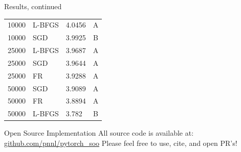 \documentclass[final]{beamer}
\newlength{\colwidth}
\begin{document}
\begin{frame}[t]
\begin{columns}[t]
\begin{column}{\colwidth}
\begin{block}{Results, continued}
\begin{table}[]
\begin{tabular}{|llll|}
            \multicolumn{1}{|l|}{10000}      & \multicolumn{1}{l|}{L-BFGS}    & \multicolumn{1}{l|}{4.0456}   & \multicolumn{1}{c|}{A}               \\
            \multicolumn{1}{|l|}{10000}      & \multicolumn{1}{l|}{SGD}       & \multicolumn{1}{l|}{3.9925}   & \multicolumn{1}{c|}{B}               \\ \hline
            \multicolumn{1}{|l|}{25000}      & \multicolumn{1}{l|}{L-BFGS}    & \multicolumn{1}{l|}{3.9687}   & \multicolumn{1}{c|}{A}               \\
            \multicolumn{1}{|l|}{25000}      & \multicolumn{1}{l|}{SGD}       & \multicolumn{1}{l|}{3.9644}   & \multicolumn{1}{c|}{A}               \\
            \multicolumn{1}{|l|}{25000}      & \multicolumn{1}{l|}{FR}        & \multicolumn{1}{l|}{3.9288}   & \multicolumn{1}{c|}{A}               \\ \hline
            \multicolumn{1}{|l|}{50000}      & \multicolumn{1}{l|}{SGD}       & \multicolumn{1}{l|}{3.9089}   & \multicolumn{1}{c|}{A}               \\
            \multicolumn{1}{|l|}{50000}      & \multicolumn{1}{l|}{FR}        & \multicolumn{1}{l|}{3.8894}   & \multicolumn{1}{c|}{A}               \\
            \multicolumn{1}{|l|}{50000}      & \multicolumn{1}{l|}{L-BFGS}    & \multicolumn{1}{l|}{3.782}    & \multicolumn{1}{c|}{B}               \\ \hline
          \end{tabular}
        \end{table}
      \end{block}

      \begin{exampleblock}{Open Source Implementation}
        All source code is available at: \href{https://github.com/pnnl/pytorch_soo}{github.com/pnnl/pytorch\_soo}\newline
        Please feel free to use, cite, and open PR's!

      \end{exampleblock}



\end{column}
\end{columns}
\end{frame}
\end{document}
